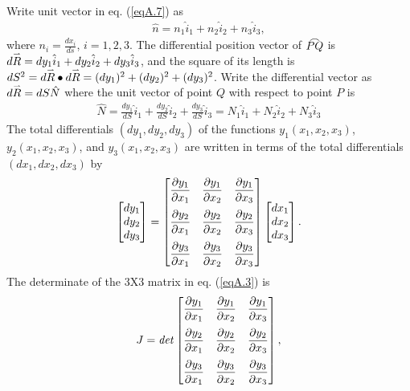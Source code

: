 \documentclass{AeroStructure-ERJohnson}
\def\harp#1{\smash{\mathord{\buildrel{\lower3pt\hbox{$\scriptscriptstyle\rightharpoonup$}}\over{#1}}}}
\def\tfrown#1{\overset{\smash{\lower3pt\hbox{$\frown$}}}{#1}}
\begin{document}
Write unit vector in eq. (\ref{eqA.7}) as
\begin{align}\label{eqA.8}
\hat{n}=n_{1} \hat{i}_{1}+n_{2} \hat{i}_{2}+n_{3} \hat{i}_{3},
\end{align}
where $n_{i}=\frac{d x_{i}}{d s}$, $i=1,2,3$. The differential position vector of $\tfrown{PQ}$ is $d \harp{R}=d y_{1} \hat{i}_{1}+d y_{2} \hat{i}_{2}+d y_{3} \hat{i}_{3}$, and the square of its length is $d S^{2}=d \harp{R} \bullet d \harp{R}=(d y_{1})^{2}+(d y_{2})^{2}+(d y_{3})^{2}$. Write the differential vector as $d\harp{R}=d S \hat{N}$ where the unit vector of point $Q$ with respect to point $P$ is
\begin{align}\label{eqA.9}
\hat{N}=\frac{d y_{1}}{d S} \hat{i}_{1}+\frac{d y_{2}}{d S} \hat{i}_{2}+\frac{d y_{3}}{d S} \hat{i}_{3}=N_{1} \hat{i}_{1}+N_{2} \hat{i}_{2}+N_{3} \hat{i}_{3}
\end{align}
The total differentials $(d y_{1}, d y_{2}, d y_{3})$ of the functions $y_{1}(x_{1}, x_{2}, x_{3})$, $y_{2}(x_{1}, x_{2}, x_{3})$, and $y_{3}(x_{1}, x_{2}, x_{3})$ are written in terms of the total differentials $(d x_{1}, d x_{2}, d x_{3})$ by
\begin{align}\label{eqA.10}
\left[\begin{array}{@{}l@{}} d y_{1} \\ d y_{2} \\ d y_{3} \end{array}\right]=\left[\begin{array}{@{}lll@{}} \displaystyle\frac{\partial y_{1}}{\partial x_{1}} & \displaystyle\frac{\partial y_{1}}{\partial x_{2}} & \displaystyle\frac{\partial y_{1}}{\partial x_{3}} \\[11pt] \displaystyle\frac{\partial y_{2}}{\partial x_{1}} & \displaystyle\frac{\partial y_{2}}{\partial x_{2}} & \displaystyle\frac{\partial y_{2}}{\partial x_{3}} \\[11pt] \displaystyle\frac{\partial y_{3}}{\partial x_{1}} & \displaystyle\frac{\partial y_{3}}{\partial x_{2}} & \displaystyle\frac{\partial y_{3}}{\partial x_{3}} \end{array}\right]\left[\begin{array}{@{}c@{}} d x_{1} \\ d x_{2} \\ d x_{3} \end{array}\right].
\end{align}
The determinate of the 3X3 matrix in eq. (\ref{eqA.3}) is
\begin{align}\label{eqA.11}
J=\operatorname{\it det}\left[\begin{array}{@{}lll@{}} \displaystyle\frac{\partial y_{1}}{\partial x_{1}} & \displaystyle\frac{\partial y_{1}}{\partial x_{2}} & \displaystyle\frac{\partial y_{1}}{\partial x_{3}} \\[11pt] \displaystyle\frac{\partial y_{2}}{\partial x_{1}} & \displaystyle\frac{\partial y_{2}}{\partial x_{2}} & \displaystyle\frac{\partial y_{2}}{\partial x_{3}} \\[11pt] \displaystyle\frac{\partial y_{3}}{\partial x_{1}} & \displaystyle\frac{\partial y_{3}}{\partial x_{2}} & \displaystyle\frac{\partial y_{3}}{\partial x_{3}} \end{array}\right],
\end{align}
\end{document}
